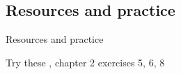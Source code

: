\documentclass{beamer}
\newcommand{\subtwofive}{Resources and practice}
\begin{document}
    \subsection{\subtwofive}
      \begin{frame}{\subtwofive}
        \begin{block}{}
          
        \end{block}
        \begin{adjustbox}{width=\textwidth}
          
        \end{adjustbox}
        \begin{block}{Try these}
          \textcite{dawson_language_2016}, chapter 2 exercises 5, 6, 8
        \end{block}
      \end{frame}
\end{document}
